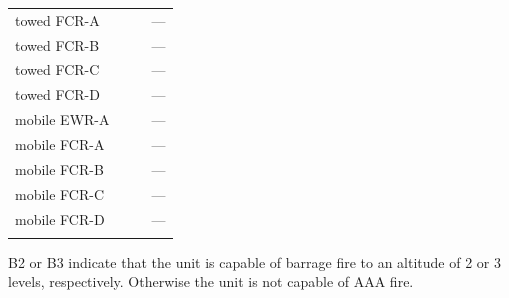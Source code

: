 \begin{tabularx}{0.5\linewidth}{Lccc}
towed FCR-A&&&---\\
towed FCR-B&&&---\\
\addlinespace
towed FCR-C&&&---\\
towed FCR-D&&&---\\
mobile EWR-A&&&---\\
\addlinespace
mobile FCR-A&&&---\\
mobile FCR-B&&&---\\
mobile FCR-C&&&---\\
\addlinespace
mobile FCR-D&&&---\\
\addlinespace
\bottomrule
\end{tabularx}
\begin{tablenote}{0.5\linewidth}
 B2 or B3 indicate that the unit is capable of barrage fire to an altitude of 2 or 3 levels, respectively. Otherwise the unit is not capable of AAA fire.
\end{tablenote}
